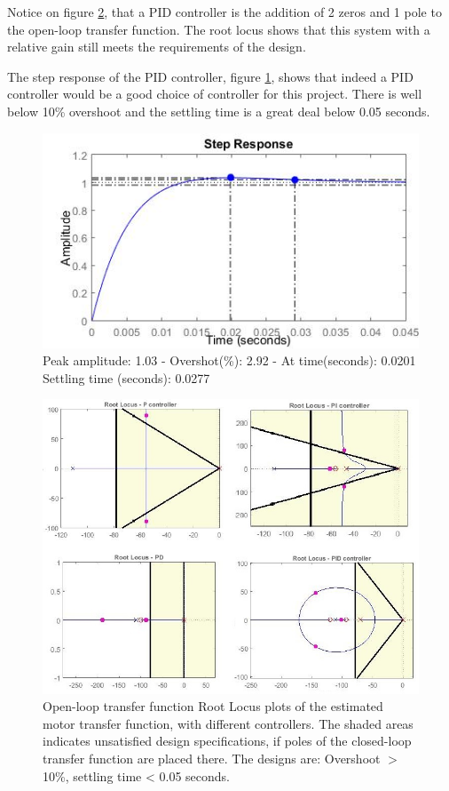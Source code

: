Notice on figure \ref{fig:RlocusControllers}, that a PID controller is the addition of 2 zeros and 1 pole to the open-loop transfer function. The root locus shows that this system with a relative gain still meets the requirements of the design.\par

The step response of the PID controller, figure \ref{fig:PIDStep}, shows that indeed a PID controller would be a good choice of controller for this project. There is well below 10\% overshoot and the settling time is a great deal below 0.05 seconds.

\begin{figure}[h!]
\centering
\includegraphics[scale=0.7]{Billeder/PIDStep.jpg}
\caption{ Peak amplitude: 1.03 - Overshot(\%): 2.92 - At time(seconds): 0.0201
		 Settling time (seconds): 0.0277 }
\label{fig:PIDStep}
\end{figure}

\begin{figure}[h!]
\centering
\includegraphics[scale=0.7]{Billeder/RlocusControllers.jpg}
\caption{ Open-loop transfer function Root Locus plots of the estimated motor transfer function, with different controllers. The shaded areas indicates unsatisfied design specifications, if poles of the closed-loop transfer function are placed there. 
The designs are: Overshoot $>$ 10\%, settling time < 0.05 seconds. }
\label{fig:RlocusControllers}
\end{figure}


